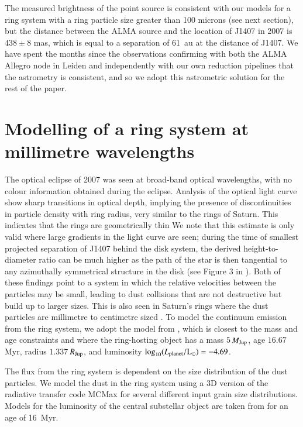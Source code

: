 \documentclass{aa} %
\newcommand\mjup{$M_{\rm Jup}$}
\newcommand\rjup{$R_{\rm Jup}$}
\begin{document}
The measured brightness of the point source is consistent with our models for a ring system with a ring particle size greater than 100 microns (see next section), but the distance between the ALMA source and the location of J1407 in 2007 is $438\pm 8$ mas, which is equal to a separation of 61~au at the distance of J1407.
%
We have spent the months since the observations confirming with both the ALMA Allegro node in Leiden and independently with our own reduction pipelines that the astrometry is consistent, and so we adopt this astrometric solution   for the rest of the paper.

\section{Modelling of a ring system at millimetre wavelengths} %

The optical eclipse of 2007 was seen at broad-band optical wavelengths, with no colour information obtained during the eclipse.
%
Analysis of the optical light curve show sharp transitions in optical depth, implying the presence of discontinuities in particle density with ring radius, very similar to the rings of Saturn.
%
This indicates that the rings are geometrically thin \citep[with a height-to-diameter ratio $h_{ring}/d_{ring}\approx 0.001$;][]{Mamajek12}
% 
We  note that this estimate is only valid where large gradients in the light curve are seen;  during the time of smallest projected separation of J1407 behind the disk system, the derived height-to-diameter ratio can be much higher as the path of the star is then tangential to any azimuthally symmetrical structure in the disk (see Figure 3 in \citealt{Kenworthy15b}).
%
Both of these findings point to a system in which the relative velocities between the particles may be small, leading to dust collisions that are not destructive but build up to larger sizes.
%
This is also seen in Saturn's rings where the dust particles are millimetre to centimetre sized \citep[e.g.][]{Tiscareno13}.
%
To model the continuum emission from the ring system, we adopt   the model from \citet{Baraffe08}, which is closest to the mass and age constraints and where the ring-hosting object has a mass $5\,$\mjup, age $16.67\,$Myr, radius $1.337\,$\rjup, and
luminosity $\log_{10}(L_{\rm planet}/{\rm L_{\odot}})=-4.69$.


The flux from the ring system is dependent on the size distribution of the dust particles.
%
We model the dust in the ring system using a 3D version of the radiative transfer code MCMax \citep{Min09} for several different input grain size distributions.
%
Models for the luminosity of the central substellar object are taken from \citet{Baraffe08} for an age of 16~Myr.
\end{document}
